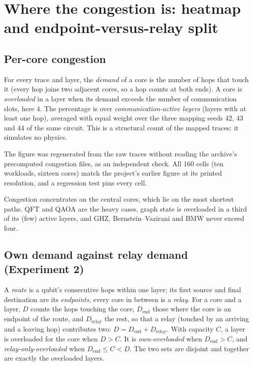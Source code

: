 \chapter{Where the congestion is: heatmap and endpoint-versus-relay split}
\label{ch:heatmap}

\section{Per-core congestion}
For every trace and layer, the \emph{demand} of a core is the number of hops that touch it (every hop joins two adjacent cores, so a hop
counts at both ends). A core is \emph{overloaded} in a layer when its demand exceeds the number of communication slots, here $4$. The
percentage is over \emph{communication-active layers} (layers with at least one hop), averaged with equal weight over the three mapping seeds
42, 43 and 44 of the same circuit. This is a structural count of the mapped traces: it simulates no physics.

The figure was regenerated from the raw traces without reading the archive's precomputed congestion files, as an independent check. All 160
cells (ten workloads, sixteen cores) match the project's earlier figure at its printed resolution, and a regression test pins every cell.




Congestion concentrates on the central cores, which lie on the most shortest paths. QFT and QAOA are the heavy cases, graph state is
overloaded in a third of its (few) active layers, and GHZ, Bernstein--Vazirani and BMW never exceed four.

\section{Own demand against relay demand (Experiment 2)}
A \emph{route} is a qubit's consecutive hops within one layer; its first source and final destination are its \emph{endpoints}, every core in
between is a \emph{relay}. For a core and a layer, $D$ counts the hops touching the core, $D_{\mathrm{end}}$ those where the core is an endpoint of the
route, and $D_{\mathrm{relay}}$ the rest, so that a relay (touched by an arriving and a leaving hop) contributes two: $D=D_{\mathrm{end}}+D_{\mathrm{relay}}$.
With capacity $C$, a layer is overloaded for the core when $D>C$. It is \emph{own-overloaded} when $D_{\mathrm{end}}>C$, and \emph{relay-only-overloaded}
when $D_{\mathrm{end}}\le C<D$. The two sets are disjoint and together are exactly the overloaded layers.

